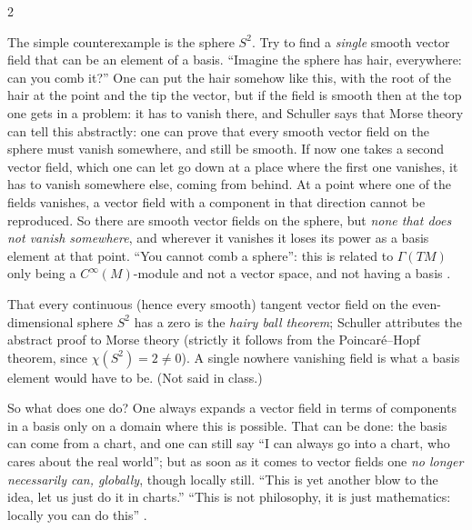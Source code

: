 \begin{paracol}{2}
\begin{example}\label{ex:c06-hairy}
The simple counterexample is the sphere $S^2$. Try to find a \emph{single} smooth vector field that can be an element of a basis. ``Imagine the sphere has hair, everywhere: can you comb it?'' One can put the hair somehow like this, with the root of the hair at the point and the tip the vector, but if the field is smooth then at the top one gets in a problem: it has to vanish there, and Schuller says that Morse theory can tell this abstractly: one can prove that every smooth vector field on the sphere must vanish somewhere, and still be smooth.
If now one takes a second vector field, which one can let go down at a place where the first one vanishes, it has to vanish somewhere else, coming from behind. At a point where one of the fields vanishes, a vector field with a component in that direction cannot be reproduced. So there are smooth vector fields on the sphere, but \emph{none that does not vanish somewhere}, and wherever it vanishes it loses its power as a basis element at that point. ``You cannot comb a sphere'':
this is related to $\Gamma(TM)$ only being a $C^\infty(M)$-module and not a vector space, and not having a basis
.
\end{example}
\begin{coursenote}
That every continuous (hence every smooth) tangent vector field on the even-dimensional sphere $S^2$ has a zero is the \emph{hairy ball theorem}; Schuller attributes the abstract proof to Morse theory (strictly it follows from the Poincar\'e--Hopf theorem, since $\chi(S^2)=2\neq0$). A single nowhere vanishing field is what a basis element would have to be. (Not said in class.)
\end{coursenote}

So what does one do? One always expands a vector field in terms of components in a basis only on a domain where this is possible. That can be done: the basis can come from a chart, and one can still say ``I can always go into a chart, who cares about the real world''; but as soon as it comes to vector fields one \emph{no longer necessarily can, globally}, though locally still. ``This is yet another blow to the idea, let us just do it in charts.'' ``This is not philosophy, it is just mathematics: locally you can do this'' .


\end{paracol}
